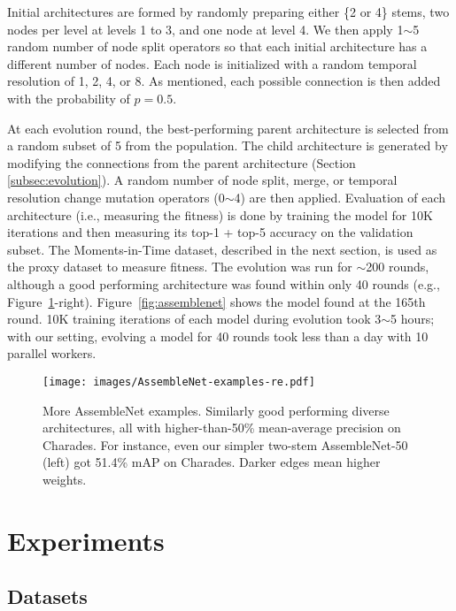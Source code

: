\documentclass{article} \usepackage{iclr2020_conference,times}
\begin{document}
Initial architectures are formed by randomly preparing either \{2 or 4\} stems, two nodes per level at levels 1 to 3, and one node at level 4.
We then apply 1$\sim$5 random number of node split operators so that each initial architecture has a different number of nodes. 
Each node is initialized with a random temporal resolution of 1, 2, 4, or 8. As mentioned, each possible connection is then added with the probability of $p=0.5$.

\vspace{-3pt}
At each evolution round, the best-performing parent architecture is selected from a random subset of 5 from the population. The child architecture is generated by modifying the connections from the parent architecture (Section \ref{subsec:evolution}). A random number of node split, merge, or temporal resolution change mutation operators (0$\sim$4) are then applied. Evaluation of each architecture (i.e., measuring the fitness) is done by training the model for 10K iterations and then measuring its top-1 + top-5 accuracy on the validation subset. The Moments-in-Time dataset, described in the next section, is used as the proxy dataset to measure fitness. 
The evolution was run for $\sim$200 rounds, although a good performing architecture was found within only 40 rounds (e.g., Figure~\ref{fig:architecture-examples}-right). Figure~\ref{fig:assemblenet} shows the model found at the 165th round. 10K training iterations of each model during evolution took 3$\sim$5 hours; with our setting, evolving a model for 40 rounds took less than a day with 10 parallel workers.



\begin{figure}
  \centering
\texttt{[image: images/AssembleNet-examples-re.pdf]}\caption{More AssembleNet examples. Similarly good performing diverse architectures, all with higher-than-50\% mean-average precision on Charades. For instance, even our simpler two-stem AssembleNet-50 (left) got 51.4\% mAP on Charades. Darker edges mean higher weights.}
  \label{fig:architecture-examples}
\end{figure}

\section{Experiments}
\vspace{-5pt}
\subsection{Datasets}
\end{document}
